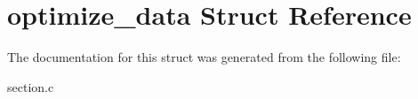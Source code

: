 \hypertarget{structoptimize__data}{\section{optimize\-\_\-data Struct Reference}
\label{structoptimize__data}
}


The documentation for this struct was generated from the following file\-:\begin{DoxyCompactItemize}
\item 
section.\-c\end{DoxyCompactItemize}
